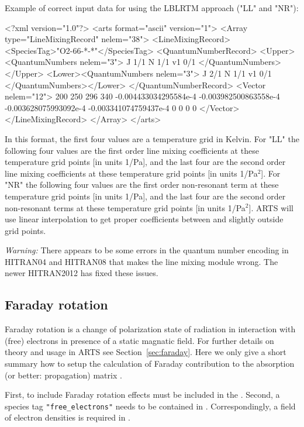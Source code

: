 Example of correct input data for using the LBLRTM approach ("LL" and "NR"):
\begin{code}
<?xml version="1.0"?>
<arts format="ascii" version="1">
<Array type="LineMixingRecord" nelem="38">
<LineMixingRecord>
<SpeciesTag>"O2-66-*-*"</SpeciesTag>
<QuantumNumberRecord>
<Upper><QuantumNumbers nelem="3"> 
  J 1/1 N 1/1 v1 0/1 
</QuantumNumbers></Upper>
<Lower><QuantumNumbers nelem="3"> 
  J 2/1 N 1/1 v1 0/1 
</QuantumNumbers></Lower>
</QuantumNumberRecord>
<Vector nelem="12">
200
250
296
340
-0.004433034295584e-4
-0.003982500863558e-4
-0.003628075993092e-4
-0.003341074759437e-4
0
0
0
0
</Vector>
</LineMixingRecord>
</Array>
</arts>
\end{code}
In this format, the first four values are a temperature grid in Kelvin.
For "LL" the following four values are the first order
line mixing coefficients at these temperature grid points [in units 1/Pa], 
and the last four are the second order line mixing coefficients at these temperature grid points [in units 1/Pa$^2$].
For "NR" the following four values are the first order
non-resonant term at these temperature grid points [in units 1/Pa], 
and the last four are the second order non-resonant terms
at these temperature grid points [in units 1/Pa$^2$].
ARTS will use linear interpolation to get proper coefficients between and slightly outside grid points.

\textit{Warning:} There appears to be some errors in the quantum number encoding
in HITRAN04 and HITRAN08 that makes the line mixing module wrong.  The newer
HITRAN2012 has fixed these issues.

\subsection{Faraday rotation}
\label{sec:absorption:faraday}

Faraday rotation is a change of polarization state of radiation in interaction
with (free) electrons in presence of a static magnatic field. For further
details on theory and usage in ARTS see Section~\ref{sec:faraday}.
Here we only give a short summary how to setup the calculation of Faraday
contribution to the absorption (or better: propagation) matrix
.

First, to include Faraday rotation effects
 must be included in the
. Second, a species tag
\verb|"free_electrons"| needs to be contained in .
Correspondingly, a field of electron densities is required in
.

